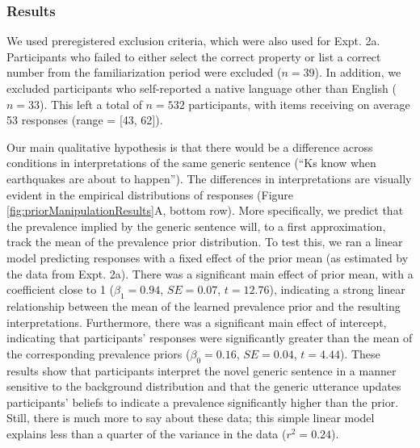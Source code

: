 \documentclass[floatsintext,doc]{apa6}
\begin{document}
\hypertarget{results-2}{%
\subsubsection{Results}\label{results-2}}

We used preregistered exclusion criteria, which were also used for Expt. 2a.
Participants who failed to either select the correct property or list a correct number from the familiarization period were excluded (\(n = 39\)).
In addition, we excluded participants who self-reported a native language other than English (\(n = 33\)).
This left a total of \(n = 532\) participants, with items receiving on average 53 responses (range = {[}43, 62{]}).

Our main qualitative hypothesis is that there would be a difference across conditions in interpretations of the same generic sentence (\enquote{Ks know when earthquakes are about to happen}).
The differences in interpretations are visually evident in the empirical distributions of responses (Figure \ref{fig:priorManipulationResults}A, bottom row).
More specifically, we predict that the prevalence implied by the generic sentence will, to a first approximation, track the mean of the prevalence prior distribution.
To test this, we ran a linear model predicting responses with a fixed effect of the prior mean (as estimated by the data from Expt. 2a).
There was a significant main effect of prior mean, with a coefficient close to 1 (\(\beta_1 = 0.94\), \(SE=0.07\), \(t = 12.76\)), indicating a strong linear relationship between the mean of the learned prevalence prior and the resulting interpretations.
Furthermore, there was a significant main effect of intercept, indicating that participants' responses were significantly greater than the mean of the corresponding prevalence priors (\(\beta_0 = 0.16\), \(SE=0.04\), \(t = 4.44\)).
These results show that participants interpret the novel generic sentence in a manner sensitive to the background distribution and that the generic utterance updates participants' beliefs to indicate a prevalence significantly higher than the prior.
Still, there is much more to say about these data; this simple linear model explains less than a quarter of the variance in the data (\(r^2 = 0.24\)).
\end{document}
